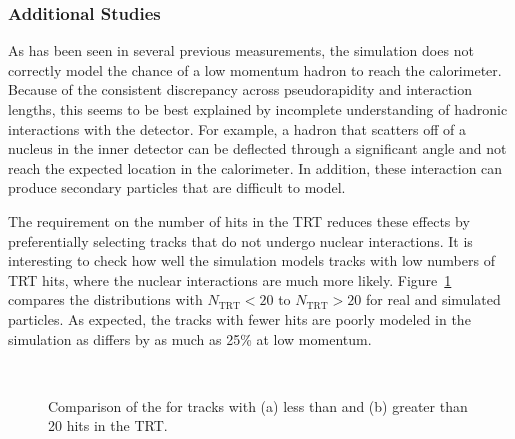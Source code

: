 \subsubsection{Additional Studies}
\label{sec:additional}

As has been seen in several previous measurements, the simulation does not correctly model the chance of a low momentum hadron to reach the calorimeter.
Because of the consistent discrepancy across pseudorapidity and interaction lengths, this seems to be best explained by incomplete understanding of hadronic interactions with the detector.
For example, a hadron that scatters off of a nucleus in the inner detector can be deflected through a significant angle and not reach the expected location in the calorimeter.
In addition, these interaction can produce secondary particles that are difficult to model.

The requirement on the number of hits in the TRT reduces these effects by preferentially selecting tracks that do not undergo nuclear interactions.
It is interesting to check how well the simulation models tracks with low numbers of TRT hits, where the nuclear interactions are much more likely. 
Figure~\ref{fig:eoverp_trt} compares the distributions with $N_{\mathrm{TRT}} < 20$ to $N_{\mathrm{TRT}} > 20$ for real and simulated particles.
As expected, the tracks with fewer hits are poorly modeled in the simulation as \epcor differs by as much as 25\% at low momentum.

\begin{figure}[h]
\centering
{}
~
\caption{Comparison of the \epcor for tracks with (a) less than and (b) greater than 20 hits in the TRT.}
\label{fig:eoverp_trt}
\end{figure}

